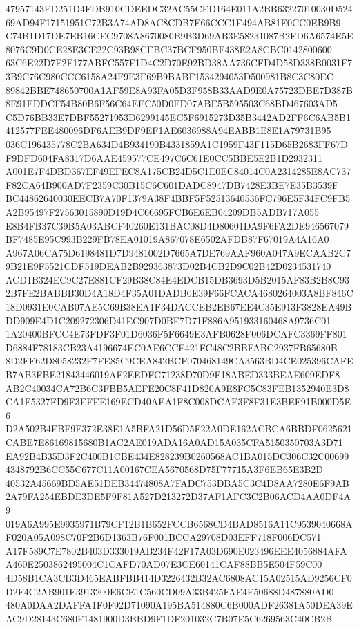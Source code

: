 \documentclass[UTF8,fontset=fandol,zihao=-4,a4paper]{ctexart}
\begin{document}
{{47957143ED251D4FDB910CDEEDC32AC55CED164E011A2BB63227010030D52469AD94F17151951C72B3A74AD8AC8CDB7E66CCC1F494AB81E0CC0EB9B9
C74B1D17DE7EB16CEC9708A8670080B9B3D69AB3E58231087B2FD6A6574E5E8076C9D0CE28E3CE22C93B98CEBC37BCF950BF438E2A8CBC0142800600
63C6E22D7F2F177ABFC557F1D4C2D70E92BD38AA736CFD4D58D338B0031F73B9C76C980CCC6158A24F9E3E69B9BABF1534294053D500981B8C3C80EC
89842BBE748650700A1AF59E8A93FA05D3F958B33AAD9E0A75723DBE7D387B8E91FDDCF54B80B6F56C64EEC50D0FD07ABE5B595503C68BD467603AD5
C5D76BB33E7DBF55271953D6299145EC5F6915273D35B3442AD2FF6C6AB5B1412577FEE480096DF6AEB9DF9EF1AE6036988A94EABB1E8E1A79731B95
036C196435778C2BA634D4B934190B4331859A1C1959F43F115D65B2683FF67DF9DFD604FA8317D6AAE459577CE497C6C61E0CC5BBE5E2B1D2932311
A001E7F4DBD367EF49EFEC8A175CB24D5C1E0EC84014C0A2314285E8AC737F82CA64B900AD7F2359C30B15C6C601DADC8947DB7428E3BE7E35B3539F
BC44862640030EECB7A70F1379A38F4BBF5F52513640536FC796E5F34FC9FB5A2B95497F27563015890D19D4C66695FCB6E6EB04209DB5ADB717A055
E8B4FB37C39B5A03ABCF40260E131BAC08D4D80601DA9F6FA2DE946567079BF7485E95C993B229FB78EA01019A867078E6502AFDB87F67019A4A16A0
A967A06CA75D6198481D7D9481002D7665A7DE769AAF960A047A9ECAAB2C79B21E9F5521CDF519DEAB2B929363873D02B4CB2D9C02B42D0234531740
ACD1B324EC9C27E881CF29B38C84E4EDCB15DB3693D5B2015AF83B2B8C932B7FE2BABBB30D4A18D4F35A01DADB0E39F66FCACA4680264003A8BF846C
18D0931E0CAB07AE5C69B38EA1F34DACCEB2EB67EE4C35E913F3828EA49BDD909E4D1C209272306D41EC907D0BE7D71F886A951933160468A9736C01
1A20400BFCC4E73FDF3F01D6036F5F6649E3AFB0628F006DCAFC3369FF801D6884F78183CB23A4196674EC0AE6CCE421FC48C2BBFABC2937FB65680B
8D2FE62D8058232F7FE85C9CEA842BCF070468149CA3563BD4CE025396CAFEB7AB3FBE21843446019AF2EEDFC71238D70D9F18ABED333BEAE609EDF8
AB2C40034CA72B6C3FBB5AEFE20C8F41D820A9E8FC5C83FEB1352940E3D8CA1F5327FD9F3EFEE169ECD40AEA1F8C008DCAE3F8F31E3BEF91B000D5E6
D2A502B4FBF9F372E38E1A5BFA21D56D5F22A0DE162ACBCA6BBDF0625621CABE7E86169815680B1AC2AE019ADA16A0AD15A035CFA5150350703A3D71
EA92B4B35D3F2C400B1CBE434E828239B0260568AC1BA015DC306C32C006994348792B6CC55C677C11A00167CEA5670568D75F77715A3F6EB65E3B2D
40532A45669BD5AE51DEB34474808A7FADC753DBA5C3C4D8AA7280E6F9AB2A79FA254EBDE3DE5F9F81A527D213272D37AF1AFC3C2B06ACD4AA0DF4A9
019A6A995E9935971B79CF12B1B652FCCB6568CD4BAD8516A11C9539040668AF020A05A098C70F2B6D1363B76F001BCCA29708D03EFF718F006DC571
A17F589C7E7802B403D333019AB234F42F17A03D690E023496EEE4056884AFAA460E2503862495004C1CAFD70AD07E3CE60141CAF88BB5E504F59C00
4D58B1CA3CB3D465EABFBB414D3226432B32AC6808AC15A02515AD9256CF0D2F4C2AB901E3913200E6CE1C560CD09A33B425FAE4E50688D487880AD0
480A0DAA2DAFFA1F0F92D71090A195BA514880C6B000ADF26381A50DEA39EAC9D28143C680F1481900D3BBD9F1DF201032C7B07E5C6269563C40CB2B
}}
\end{document}
